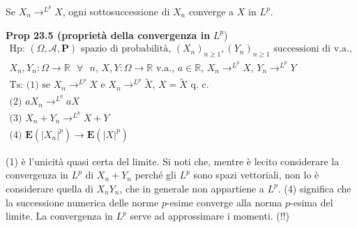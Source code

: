 \documentclass{article}
\begin{document}
Se $X_{n}\rightarrow ^{L^{p}}X$, ogni sottosuccessione di $X_{n}$ converge a 
$X$ in $L^{p}$.

\textbf{Prop 23.5 (propriet\`{a} della convergenza in }$L^{p}$)%
\begin{gather*}
\text{Hp: }\left( \Omega ,\mathcal{A},\mathbf{P}\right) \text{ spazio di
probabilit\`{a}, }\left( X_{n}\right) _{n\geq 1},\left( Y_{n}\right) _{n\geq
1}\text{ successioni di v.a., } \\
X_{n},Y_{n}:\Omega \rightarrow 
\mathbb{R}
\text{ }\forall \text{ }n\text{, }X,Y:\Omega \rightarrow 
\mathbb{R}
\text{ v.a., }a\in 
\mathbb{R}
\text{, }X_{n}\rightarrow ^{L^{p}}X\text{, }Y_{n}\rightarrow ^{L^{p}}Y \\
\text{Ts: (1) se }X_{n}\rightarrow ^{L^{p}}X\text{ e }X_{n}\rightarrow
^{L^{p}}\tilde{X}\text{, }X=\tilde{X}\text{ q. c.} \\
\text{(2) }aX_{n}\rightarrow ^{L^{p}}aX \\
\text{(3) }X_{n}+Y_{n}\rightarrow ^{L^{p}}X+Y \\
\text{(4) }\mathbf{E}\left( \left\vert X_{n}\right\vert ^{p}\right)
\rightarrow \mathbf{E}\left( \left\vert X\right\vert ^{p}\right)
\end{gather*}

(1) \`{e} l'unicit\`{a} quasi certa del limite. Si noti che, mentre \`{e}
lecito considerare la convergenza in $L^{p}$ di $X_{n}+Y_{n}$ perch\'{e} gli 
$L^{p}$ sono spazi vettoriali, non lo \`{e} considerare quella di $%
X_{n}Y_{n} $, che in generale non appartiene a $L^{p}$. (4) significa che la
successione numerica delle norme $p$-esime converge alla norma $p$-esima del
limite. La convergenza in $L^{p}$ serve ad approssimare i momenti. (!!)
\end{document}
